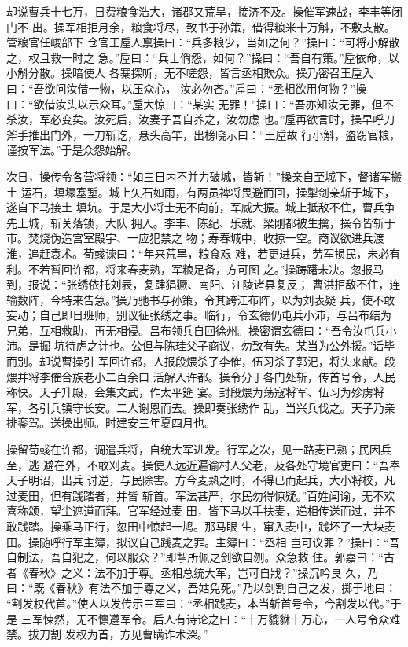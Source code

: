 却说曹兵十七万，日费粮食浩大，诸郡又荒旱，接济不及。操催军速战，李丰等闭门不
出。操军相拒月余，粮食将尽，致书于孙策，借得粮米十万斛，不敷支散。管粮官任峻部下
仓官王垕人禀操曰：“兵多粮少，当如之何？”操曰：“可将小解散之，权且救一时之
急。”垕曰：“兵士倘怨，如何？”操曰：“吾自有策。”垕依命，以小斛分散。操暗使人
各寨探听，无不嗟怨，皆言丞相欺众。操乃密召王垕入曰：“吾欲问汝借一物，以压众心，
汝必勿吝。”垕曰：“丞相欲用何物？”操曰：“欲借汝头以示众耳。”垕大惊曰：“某实
无罪！”操曰：“吾亦知汝无罪，但不杀汝，军必变矣。汝死后，汝妻子吾自养之，汝勿虑
也。”垕再欲言时，操早呼刀斧手推出门外，一刀斩讫，悬头高竿，出榜晓示曰：“王垕故
行小斛，盗窃官粮，谨按军法。”于是众怨始解。

次日，操传令各营将领：“如三日内不并力破城，皆斩！”操亲自至城下，督诸军搬土
运石，填壕塞堑。城上矢石如雨，有两员裨将畏避而回，操掣剑亲斩于城下，遂自下马接土
填坑。于是大小将士无不向前，军威大振。城上抵敌不住，曹兵争先上城，斩关落锁，大队
拥入。李丰、陈纪、乐就、梁刚都被生擒，操令皆斩于市。焚烧伪造宫室殿宇、一应犯禁之
物；寿春城中，收掠一空。商议欲进兵渡淮，追赶袁术。荀彧谏曰：“年来荒旱，粮食艰
难，若更进兵，劳军损民，未必有利。不若暂回许都，将来春麦熟，军粮足备，方可图
之。”操踌躇未决。忽报马到，报说：“张绣依托刘表，复肆猖獗、南阳、江陵诸县复反；
曹洪拒敌不住，连输数阵，今特来告急。”操乃驰书与孙策，令其跨江布阵，以为刘表疑
兵，使不敢妄动；自己即日班师，别议征张绣之事。临行，令玄德仍屯兵小沛，与吕布结为
兄弟，互相救助，再无相侵。吕布领兵自回徐州。操密谓玄德曰：“吾令汝屯兵小沛。是掘
坑待虎之计也。公但与陈珪父子商议，勿致有失。某当为公外援。”话毕而别。却说曹操引
军回许都，人报段煨杀了李傕，伍习杀了郭汜，将头来献。段煨并将李傕合族老小二百余口
活解入许都。操令分于各门处斩，传首号令，人民称快。天子升殿，会集文武，作太平筵
宴。封段煨为荡寇将军、伍习为殄虏将军，各引兵镇守长安。二人谢恩而去。操即奏张绣作
乱，当兴兵伐之。天子乃亲排銮驾。送操出师。时建安三年夏四月也。

操留荀彧在许都，调遣兵将，自统大军进发。行军之次，见一路麦已熟；民因兵至，逃
避在外，不敢刈麦。操使人远近遍谕村人父老，及各处守境官吏曰：“吾奉天子明诏，出兵
讨逆，与民除害。方今麦熟之时，不得已而起兵，大小将校，凡过麦田，但有践踏者，并皆
斩首。军法甚严，尔民勿得惊疑。”百姓闻谕，无不欢喜称颂，望尘遮道而拜。官军经过麦
田，皆下马以手扶麦，递相传送而过，并不敢践踏。操乘马正行，忽田中惊起一鸠。那马眼
生，窜入麦中，践坏了一大块麦田。操随呼行军主簿，拟议自己践麦之罪。主簿曰：“丞相
岂可议罪？”操曰：“吾自制法，吾自犯之，何以服众？”即掣所佩之剑欲自刎。众急救
住。郭嘉曰：“古者《春秋》之义：法不加于尊。丞相总统大军，岂可自戕？”操沉吟良
久，乃曰：“既《春秋》有法不加于尊之义，吾姑免死。”乃以剑割自己之发，掷于地曰：
“割发权代首。”使人以发传示三军曰：“丞相践麦，本当斩首号令，今割发以代。”于是
三军悚然，无不懔遵军令。后人有诗论之曰：“十万貔貅十万心，一人号令众难禁。拔刀割
发权为首，方见曹瞒诈术深。”

